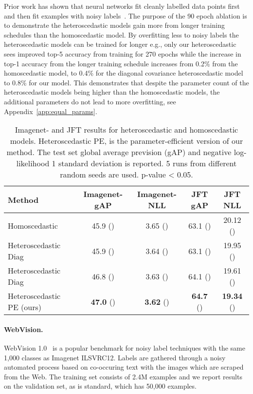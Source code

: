 \documentclass[final]{cvpr}
\begin{document}
Prior work has shown that neural networks fit cleanly labelled data points first and then fit examples with noisy labels~\cite{krueger2017closer}. The purpose of the 90 epoch ablation is to demonstrate the heteroscedastic models gain more from longer training schedules than the homoscedastic model. By overfitting less to noisy labels the heteroscedastic models can be trained for longer e.g., only our heteroscedastic sees improved top-5 accuracy from training for 270 epochs while the increase in top-1 accuracy from the longer training schedule increases from 0.2\% from the homoscedastic model, to 0.4\% for the diagonal covariance heteroscedastic model to 0.8\% for our model. This demonstrates that despite the parameter count of the heteroscedastic models being higher than the homoscedastic models, the additional parameters do not lead to more overfitting, see Appendix~\ref{app:equal_params}.

\begin{table*}[tbh]
\centering
\begin{tabular}{lcccc}
\toprule
Method & Imagenet- gAP & Imagenet- NLL & JFT gAP & JFT NLL \\
\midrule
Homoscedastic & 45.9 () & 3.65 () & 63.1 () & 20.12 () \\
Heteroscedastic Diag ~\cite{collier2020analysis} & 45.9   () & 3.64 () & 63.1 ()  & 19.95 ()\\ 
Heteroscedastic Diag ~\cite{collier2020analysis} & 46.8   () & 3.63 () & 64.1 () & 19.61 ()\\ 
Heteroscedastic PE  (ours) & \textbf{47.0}  () & \textbf{3.62} () & \textbf{64.7} () & \textbf{19.34} ()\\ 
\bottomrule
\end{tabular}
\caption{Imagenet- and JFT results for heteroscedastic and homoscedastic models. Heteroscedastic PE, is the parameter-efficient version of our method. The test set global average prevision (gAP) and negative log-likelihood  1 standard deviation is reported. 5 runs from different random seeds are used.  p-value < 0.05.}
\label{table:het_vs_hom_imagenet_jft}
\end{table*}

\paragraph{WebVision.} WebVision 1.0~\cite{li2017webvision} is a popular benchmark for noisy label techniques with the same 1,000 classes as Imagenet ILSVRC12. Labels are gathered through a noisy automated process based on co-occuring text with the images which are scraped from the Web. The training set consists of 2.4M examples and we report results on the validation set, as is standard, which has 50,000 examples.
\end{document}
